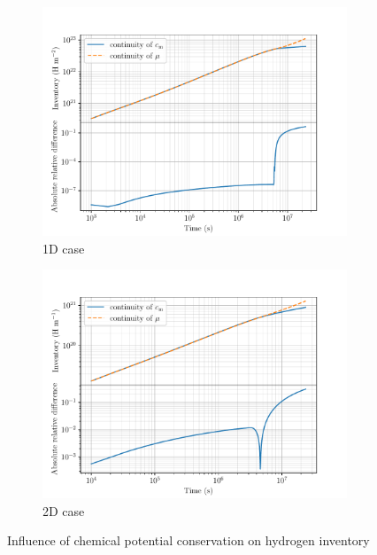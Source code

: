 \begin{figure}[ht]
    \centering
    \begin{subfigure}{0.5\linewidth}
        \includegraphics[width=\linewidth]{Figures/Chapter3/monoblocks/interface_condition/iter case/comparison_inventory_1d.pdf}
        \caption{1D case}
        \label{fig: 1D inventories}
    \end{subfigure}%
    \begin{subfigure}{0.5\linewidth} 
        \includegraphics[width=\linewidth]{Figures/Chapter3/monoblocks/interface_condition/iter case/comparison_inventory_2d.pdf}
        \caption{2D case}
        \label{fig: 2D inventories}
    \end{subfigure}
    \caption{Influence of chemical potential conservation on hydrogen inventory}
\end{figure}

